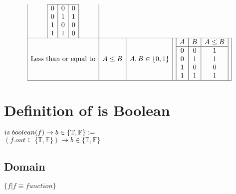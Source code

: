 \documentclass[11pt]{article}
\begin{document}
\[\begin{array}{|c|c|c|c|}
\begin{array}{|c|c|c|}
\hline
0 & 0 & 0 \\
0 & 1 & 1 \\
1 & 0 & 0 \\
1 & 1 & 0 \\
\end{array} \\
\hline
\text{Less than or equal to} & A \leq B & A, B \in \{0,1\} & \begin{array}{|c|c|c|}
A & B & A \leq B \\
\hline
0 & 0 & 1 \\
0 & 1 & 1 \\
1 & 0 & 0 \\
1 & 1 & 1 \\
\end{array} \\
\hline
\end{array}
\]



\newpage
\section{Definition of is Boolean}
\begin{center}
$
is \hspace{1mm} boolean(f) \rightarrow b \in \{\mathbb{T},\mathbb{F}\} :=
$
\\ \vspace{2mm}
$
(f.out \subseteq \{\mathbb{T},\mathbb{F}\}) \rightarrow b \in \{\mathbb{T},\mathbb{F}\}
$
\end{center}


\subsection{Domain}
\begin{center}
$
\{f | f \equiv function\}
$
\end{center}

\end{document}
